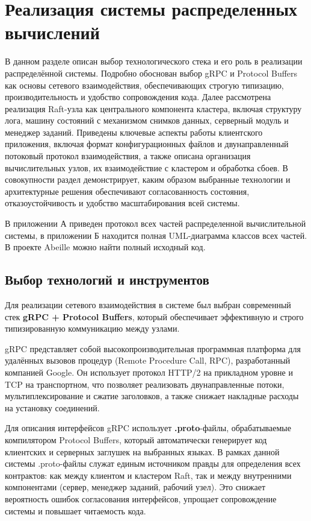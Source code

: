 \section{Реализация системы распределенных вычислений}

В данном разделе описан выбор технологического стека и его роль в реализации
распределённой системы. Подробно обоснован выбор gRPC и Protocol Buffers как
основы сетевого взаимодействия, обеспечивающих строгую типизацию,
производительность и удобство сопровождения кода. Далее рассмотрена реализация
Raft-узла как центрального компонента кластера, включая структуру лога, машину
состояний с механизмом снимков данных, серверный модуль и менеджер заданий.
Приведены ключевые аспекты работы клиентского приложения, включая формат
конфигурационных файлов и двунаправленный потоковый протокол взаимодействия, а
также описана организация вычислительных узлов, их взаимодействие с кластером и
обработка сбоев. В совокупности раздел демонстрирует, каким образом выбранные
технологии и архитектурные решения обеспечивают согласованность состояния,
отказоустойчивость и удобство масштабирования всей системы.

В приложении А приведен протокол всех частей распределенной вычислительной
системы, в приложении Б находится полная UML-диаграмма классов всех частей. В
проекте Abeille \cite{abeille} можно найти полный исходный код.

\subsection{Выбор технологий и инструментов}

Для реализации сетевого взаимодействия в системе был выбран современный
стек \textbf{gRPC + Protocol Buffers}, который обеспечивает эффективную
и строго типизированную коммуникацию между узлами.

gRPC представляет собой высокопроизводительная программная платформа для удалённых
вызовов процедур (Remote Procedure Call, RPC), разработанный компанией Google.
Он использует протокол HTTP/2 на прикладном уровне и TCP на транспортном,
что позволяет реализовать двунаправленные потоки, мультиплексирование
и сжатие заголовков, а также снижает накладные расходы на установку соединений.

Для описания интерфейсов gRPC использует \textbf{.proto}-файлы,
обрабатываемые компилятором Protocol Buffers, который автоматически
генерирует код клиентских и серверных заглушек на выбранных языках.
В рамках данной системы .proto-файлы служат единым источником правды
для определения всех контрактов: как между клиентом и кластером Raft,
так и между внутренними компонентами (сервер, менеджер заданий, рабочий узел).
Это снижает вероятность ошибок согласования интерфейсов,
упрощает сопровождение системы и повышает читаемость кода.

